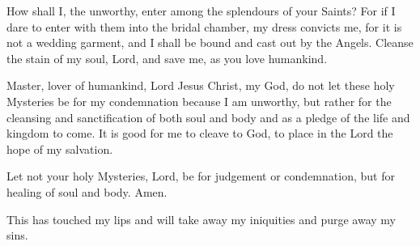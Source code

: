 
How shall I, the unworthy, enter among the splendours of your Saints? For if I dare to enter with them into the bridal chamber, my dress convicts me, for it is not a wedding garment, and I shall be bound and cast out by the Angels. Cleanse the stain of my soul, Lord, and save me, as you love humankind.


Master, lover of humankind, Lord Jesus Christ, my God, do not let these holy Mysteries be for my condemnation because I am unworthy, but rather for the cleansing and sanctification of both soul and body and as a pledge of the life and kingdom to come. It is good for me to cleave to God, to place in the Lord the hope of my salvation.


\mysticalsupper

Let not your holy Mysteries, Lord, be for judgement or condemnation, but for healing of soul and body. Amen.


This has touched my lips and will take away my iniquities and purge away my sins.
